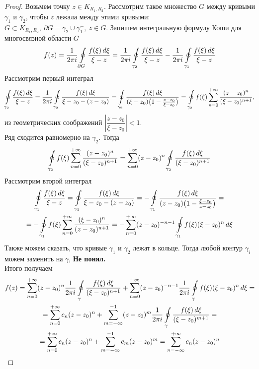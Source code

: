 	\begin{proof}
		Возьмем точку $z\in K_{R_1, R_2}$. Рассмотрим такое множество $G$ между кривыми $\gamma_1$ и $\gamma_2$, чтобы $z$ лежала между этими кривыми: $G \subset K_{R_1, R_2},\ \partial G = \gamma_2\cup\gamma_1^-,\ z\in G.$
		Запишем интегральную формулу Коши для многосвязной области $G$
		\[ f(z) = \frac{1}{2\pi i}\oint\limits_{\partial G}\frac{f(\xi)\,d\xi}{\xi - z} = \frac{1}{2\pi i}\oint\limits_{\gamma_2} \frac{f(\xi)\,d\xi}{\xi-z}-\frac{1}{2\pi i}\oint\limits_{\gamma_1}\frac{f(\xi)\,d\xi}{\xi - z} \]
		Рассмотрим первый интеграл
		\[\oint\limits_{\gamma_2} \frac{f(\xi)\,d\xi}{\xi-z}= \frac{1}{2\pi i}\oint\limits_{\gamma_2}\frac{f(\xi)\,d\xi}{\xi-z_0-(z-z_0)}=\oint\limits_{\gamma_2}\frac{f(\xi)\,d\xi}{(\xi-z_0)\big(1-\frac{z-z_0}{\xi-z_0}\big)}=\oint\limits_{\gamma_2}f(\xi)\sum\limits_{n=0}^{+\infty}\frac{(z-z_0)^n}{(\xi-z_0)^{n+1}},\]
		из геометрических соображений $\left|\dfrac{z - z_0}{\xi - z_0}\right| < 1.$\\
		Ряд сходится равномерно на $\gamma_2$. Тогда
		\[\oint\limits_{\gamma_2}f(\xi)\sum\limits_{n=0}^{+\infty}\frac{(z-z_0)^n}{(\xi-z_0)^{n+1}} =\sum\limits_{n=0}^{+\infty}(z-z_0)^n\oint\limits_{\gamma_2}\frac{f(\xi)\,d\xi}{(\xi-z_0)^{n+1}} \]
		Рассмотрим второй интеграл
		\begin{multline*}
			\oint\limits_{\gamma_1} \frac{f(\xi)\,d\xi}{\xi-z}=\oint\limits_{\gamma_1}\frac{f(\xi)\,d\xi}{\xi-z_0-(z-z_0)}=-\oint\limits_{\gamma_1}\frac{f(\xi)\,d\xi}{(z-z_0)\big(1-\frac{\xi-z_0}{z-z_0}\big)}=\\=-\oint\limits_{\gamma_1}f(\xi)\sum\limits_{n=0}^{+\infty}\frac{(\xi-z_0)^n}{(z-z_0)^{n+1}} = -\sum\limits_{n=0}^{+\infty}(z-z_0)^{-n-1}\oint\limits_{\gamma_1}f(\xi)(\xi - z_0)^n\,d\xi
		\end{multline*}
		Также можем сказать, что кривые $\gamma_1$ и $\gamma_2$ лежат в кольце. Тогда любой контур $\gamma_i$ можем заменить на $\gamma$, \textbf{Не понял.}\\
		Итого получаем
		\begin{multline*}
			f(z) = \sum\limits_{n=0}^{+\infty}(z-z_0)^n\frac{1}{2\pi i}\oint\limits_\gamma\frac{f(\xi)\,d\xi}{(\xi-z_0)^{n+1}} + \sum\limits_{n=0}^{+\infty}(z-z_0)^{-n-1}\frac{1}{2\pi i}\oint\limits_\gamma f(\xi)(\xi - z_0)^n\,d\xi =\\= \sum\limits_{n=0}^{+\infty}c_n(z-z_0)^n + \sum\limits_{m=-\infty}^{-1}(z-z_0)^m\frac{1}{2\pi i}\oint\limits_\gamma \frac{f(\xi)\,d\xi}{(\xi-z_0)^{m+1}} =\\= \sum\limits_{n=0}^{+\infty}c_n(z-z_0)^n + \sum\limits_{m=-\infty}^{-1}c_m(z-z_0)^m = \sum\limits_{n = -\infty}^{+\infty} c_n(z - z_0)^n
		\end{multline*}
	\end{proof}
